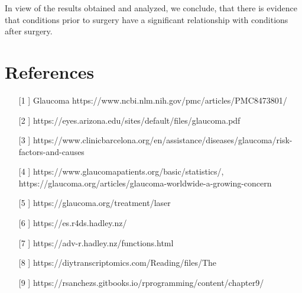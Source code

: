 \documentclass{article}
\begin{document}
In view of the results obtained and analyzed, we conclude, that there is evidence that conditions prior to surgery have a significant relationship with conditions after 
surgery.

\newpage

\section{References}

\begin{itemize}
    \item [ [1] ] Glaucoma https://www.ncbi.nlm.nih.gov/pmc/articles/PMC8473801/
    \item [[2]] https://eyes.arizona.edu/sites/default/files/glaucoma.pdf
    \item [[3]] https://www.clinicbarcelona.org/en/assistance/diseases/glaucoma/risk-factors-and-causes
    \item [[4]] https://www.glaucomapatients.org/basic/statistics/, 
    https://glaucoma.org/articles/glaucoma-worldwide-a-growing-concern 
    \item [[5]] https://glaucoma.org/treatment/laser
    \item [[6]] https://es.r4ds.hadley.nz/ 
    \item [[7]] https://adv-r.hadley.nz/functions.html
    \item [[8]] https://diytranscriptomics.com/Reading/files/The%
    \item [[9]] https://rsanchezs.gitbooks.io/rprogramming/content/chapter9/

\end{itemize}
\end{document}
